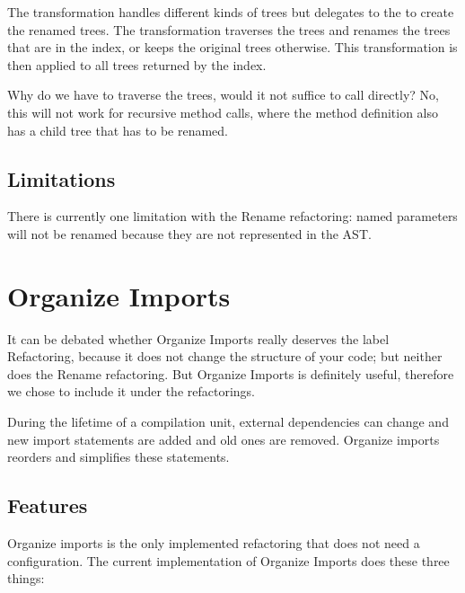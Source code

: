 \documentclass[10pt,a4paper,oneside]{scrreprt}
\begin{document}
The  transformation handles different kinds of trees but delegates to the  to create the renamed trees. The  transformation traverses the trees and renames the trees that are in the index, or keeps the original trees otherwise. This transformation is then applied to all trees returned by the index.

Why do we have to traverse the trees, would it not suffice to call  directly? No, this will not work for recursive method calls, where the method definition also has a child tree that has to be renamed.

\subsection{Limitations}

There is currently one limitation with the Rename refactoring: named parameters will not be renamed because they are not represented in the AST.

\section{Organize Imports}

It can be debated whether Organize Imports really deserves the label Refactoring, because it does not change the structure of your code; but neither does the Rename refactoring. But Organize Imports is definitely useful, therefore we chose to include it under the refactorings.

During the lifetime of a compilation unit, external dependencies can change and new import statements are added and old ones are removed. Organize imports reorders and simplifies these statements.

\subsection{Features}

Organize imports is the only implemented refactoring that does not need a configuration. The current implementation of Organize Imports does these three things:
\end{document}
